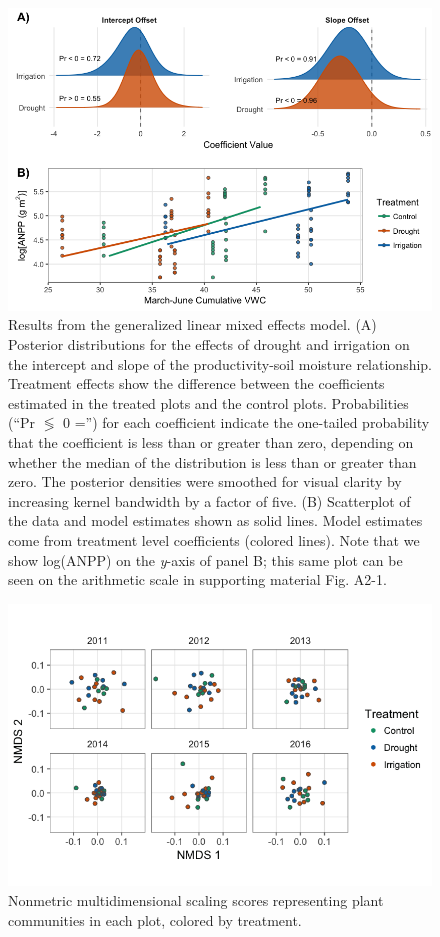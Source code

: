 \documentclass[fleqn,10pt,lineno]{wlpeerj} %
\begin{document}
\begin{figure}[!ht]
  \centering
      \includegraphics[width=5in]{../figures/glmm_main_results.png}
  \caption{Results from the generalized linear mixed effects model. (A) Posterior distributions for the effects of drought and irrigation on the intercept and slope of the productivity-soil moisture relationship. Treatment effects show the difference between the coefficients estimated in the treated plots and the control plots. Probabilities (``Pr $\lessgtr$ 0 ='') for each coefficient indicate the one-tailed probability that the coefficient is less than or greater than zero, depending on whether the median of the distribution is less than or greater than zero. The posterior densities were smoothed for visual clarity by increasing kernel bandwidth by a factor of five. (B) Scatterplot of the data and model estimates shown as solid lines. Model estimates come from treatment level coefficients (colored lines). Note that we show log(ANPP) on the \emph{y}-axis of panel B; this same plot can be seen on the arithmetic scale in supporting material Fig. A2-1.}
\end{figure}

\newpage{}

\begin{figure}[!ht]
  \centering
      \includegraphics[width=5in]{../figures/sppcomp_bray_all.png}
  \caption{Nonmetric multidimensional scaling scores representing plant communities in each plot, colored by treatment.}
\end{figure}

\newpage{}



\end{document}
